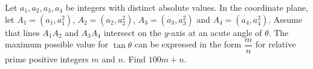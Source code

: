 Let $a_1, a_2, a_3, a_4$ be integers with distinct absolute values. In the coordinate plane, let $A_1=(a_1,a_1^2)$, $A_2=(a_2,a_2^2)$, $A_3=(a_3,a_3^2)$ and $A_4=(a_4,a_4^2)$. Assume that lines $A_1A_2$ and $A_3A_4$ intersect on the $y$-axis at an acute angle of $\theta$. The maximum possible value for $\tan \theta$ can be expressed in the form $\dfrac mn$ for relative prime positive integers $m$ and $n$. Find $100m+n$.
